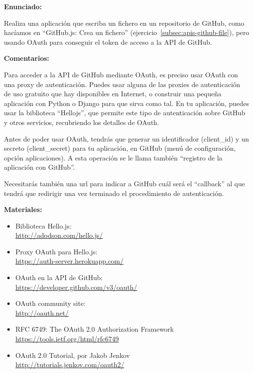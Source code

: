 \textbf{Enunciado:}

Realiza una aplicación que escriba un fichero en un repositorio de GitHub, como hacíamos en ``GitHub.js: Crea un fichero'' (ejercicio~\ref{subsec:apis-github-file}), pero usando OAuth para conseguir el token de acceso a la API de GitHub.

\textbf{Comentarios:}

Para acceder a la API de GitHub mediante OAuth, es preciso usar OAuth con una proxy de autenticación. Puedes usar alguna de las proxies de autenticación de uso gratuito que hay disponibles en Internet, o construir una pequeña aplicación con Python o Django para que sirva como tal. En tu aplicación, puedes usar la biblioteca ``Hellojs'', que permite este tipo de autenticación sobre GitHub y otros servicios, recubriendo los detalles de OAuth.

Antes de poder usar OAuth, tendrás que generar un identificador (client\_id) y un secreto (client\_secret) para tu aplicación, en GitHub (menú de configuración, opción aplicaciones). A esta operación se le llama también ``registro de la aplicación con GitHub''.

Necesitarás también una url para indicar a GitHub cuál será el ``callback'' al que tendrá que redirigir una vez terminado el procedimiento de autenticación.

\textbf{Materiales:}

\begin{itemize}
\item Biblioteca Hello.js: \\
  \url{http://adodson.com/hello.js/}
\item Proxy OAuth para Hello.js: \\
  \url{https://auth-server.herokuapp.com/}
\item OAuth en la API de GitHub: \\
  \url{https://developer.github.com/v3/oauth/}
\item OAuth community site: \\
  \url{http://oauth.net/}
\item RFC 6749: The OAuth 2.0 Authorization Framework \\
  \url{https://tools.ietf.org/html/rfc6749}
\item OAuth 2.0 Tutorial, por Jakob Jenkov \\
  \url{http://tutorials.jenkov.com/oauth2/}
\end{itemize}

